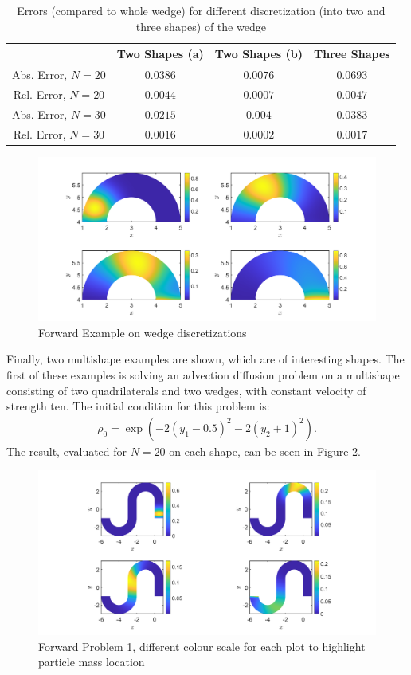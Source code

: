 \documentclass[11pt, a4paper]{article}
\theoremstyle{definition}
\begin{document}
\begin{table}
	\caption{Errors (compared to whole wedge) for different discretization (into two and three shapes) of the wedge}
	\begin{tabular}{ ||c| c| c| c|| }
		\hline
		\hline
		& Two Shapes (a) & Two Shapes (b) & Three Shapes\\ 
		\hline
		Abs. Error, $N =20$& $0.0386$ & $0.0076$ & $0.0693$ \\  
		Rel. Error, $N =20$& $0.0044$& $0.0007$ &$0.0047$ \\
		Abs. Error, $N =30$& $0.0215$ & $0.004$ & $0.0383$  \\  
		Rel. Error, $N =30$ & $0.0016$& $0.0002$ &$0.0017$  \\
		\hline
		\hline
	\end{tabular}
	\label{Tab4:ErrorsFWWedge}
\end{table}
\begin{figure}[h]
	\centering
	\includegraphics[scale=0.35]{FWWedge.png}
	\caption{Forward Example on wedge discretizations} 
	\label{FFW2}
\end{figure}



Finally, two multishape examples are shown, which are of interesting shapes.
The first of these examples is solving an advection diffusion problem on a multishape consisting of two quadrilaterals and two wedges, with constant velocity of strength ten. The initial condition for this problem is:
 \begin{align*}
 	\rho_0 = \exp( -2(y_1 -0.5)^2 - 2 (y_2 + 1)^2).
 \end{align*}
The result, evaluated for $N= 20$ on each shape, can be seen in Figure \ref{F8}.

\begin{figure}[h]
	\centering
	\includegraphics[scale=0.35]{ex1.png}
	\caption{Forward Problem 1, different colour scale for each plot to highlight particle mass location}
	\label{F8}
\end{figure}
\end{document}
